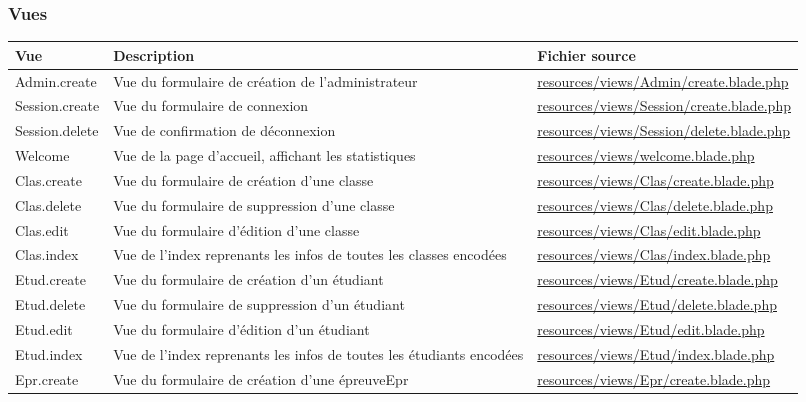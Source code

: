 \subsubsection{Vues}

\begin{table}[H]
	\begin{adjustbox}{width=\textwidth}
		\begin{tabular}{|l|p{}|p{}|}
			\hline
			\textbf{Vue} & \textbf{Description} & \textbf{Fichier source} \\
			\hline
			Admin.create & Vue du formulaire de création de l'administrateur & \url{resources/views/Admin/create.blade.php} \\
			Session.create 	& Vue du formulaire de connexion 														 & \url{resources/views/Session/create.blade.php} \\
			Session.delete 	& Vue de confirmation de déconnexion 													 & \url{resources/views/Session/delete.blade.php} \\
			Welcome 		& Vue de la page d'accueil, affichant les statistiques 								 & \url{resources/views/welcome.blade.php} \\
			Clas.create 	& Vue du formulaire de création d'une classe 											 & \url{resources/views/Clas/create.blade.php} \\
			Clas.delete 	& Vue du formulaire de suppression d'une classe 										 & \url{resources/views/Clas/delete.blade.php} \\
			Clas.edit 		& Vue du formulaire d'édition d'une classe 											 & \url{resources/views/Clas/edit.blade.php} \\
			Clas.index 		& Vue de l'index reprenants les infos de toutes les classes encodées 					 & \url{resources/views/Clas/index.blade.php} \\
			Etud.create 	& Vue du formulaire de création d'un étudiant 										 & \url{resources/views/Etud/create.blade.php} \\
			Etud.delete 	& Vue du formulaire de suppression d'un étudiant 										 & \url{resources/views/Etud/delete.blade.php} \\
			Etud.edit 		& Vue du formulaire d'édition d'un étudiant 											 & \url{resources/views/Etud/edit.blade.php} \\
			Etud.index 		& Vue de l'index reprenants les infos de toutes les étudiants encodées 				 & \url{resources/views/Etud/index.blade.php} \\
			Epr.create 		& Vue du formulaire de création d'une épreuveEpr 										 & \url{resources/views/Epr/create.blade.php} \\

\end{tabular}
\end{adjustbox}
\end{table}
